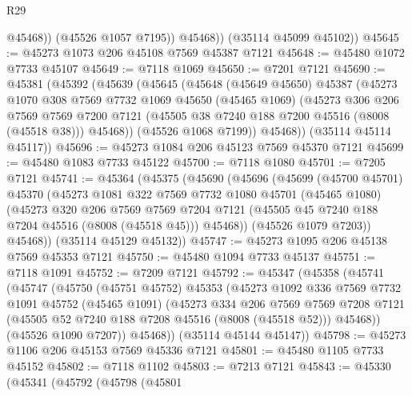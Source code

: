 \begin{lexlean}{R29}
\begin{coremodule}
                @45468))
            (@45526 @1057 @7195))
          @45468))
      (@35114 @45099 @45102))
@45645 := @45273 @1073 @206 @45108 @7569 @45387 @7121
@45648 := @45480 @1072 @7733 @45107
@45649 := @7118 @1069
@45650 := @7201 @7121
@45690 := @45381
    (@45392
      (@45639
        (@45645
          (@45648
            (@45649 @45650)
            @45387
            (@45273
              @1070
              @308
              @7569
              @7732
              @1069
              @45650
              (@45465 @1069)
              (@45273
                @306
                @206
                @7569
                @7569
                @7200
                @7121
                (@45505 @38 @7240 @188 @7200 @45516 (@8008 (@45518 @38)))
                @45468))
            (@45526 @1068 @7199))
          @45468))
      (@35114 @45114 @45117))
@45696 := @45273 @1084 @206 @45123 @7569 @45370 @7121
@45699 := @45480 @1083 @7733 @45122
@45700 := @7118 @1080
@45701 := @7205 @7121
@45741 := @45364
    (@45375
      (@45690
        (@45696
          (@45699
            (@45700 @45701)
            @45370
            (@45273
              @1081
              @322
              @7569
              @7732
              @1080
              @45701
              (@45465 @1080)
              (@45273
                @320
                @206
                @7569
                @7569
                @7204
                @7121
                (@45505 @45 @7240 @188 @7204 @45516 (@8008 (@45518 @45)))
                @45468))
            (@45526 @1079 @7203))
          @45468))
      (@35114 @45129 @45132))
@45747 := @45273 @1095 @206 @45138 @7569 @45353 @7121
@45750 := @45480 @1094 @7733 @45137
@45751 := @7118 @1091
@45752 := @7209 @7121
@45792 := @45347
    (@45358
      (@45741
        (@45747
          (@45750
            (@45751 @45752)
            @45353
            (@45273
              @1092
              @336
              @7569
              @7732
              @1091
              @45752
              (@45465 @1091)
              (@45273
                @334
                @206
                @7569
                @7569
                @7208
                @7121
                (@45505 @52 @7240 @188 @7208 @45516 (@8008 (@45518 @52)))
                @45468))
            (@45526 @1090 @7207))
          @45468))
      (@35114 @45144 @45147))
@45798 := @45273 @1106 @206 @45153 @7569 @45336 @7121
@45801 := @45480 @1105 @7733 @45152
@45802 := @7118 @1102
@45803 := @7213 @7121
@45843 := @45330
    (@45341
      (@45792
        (@45798
          (@45801

\end{coremodule}
\end{lexlean}
